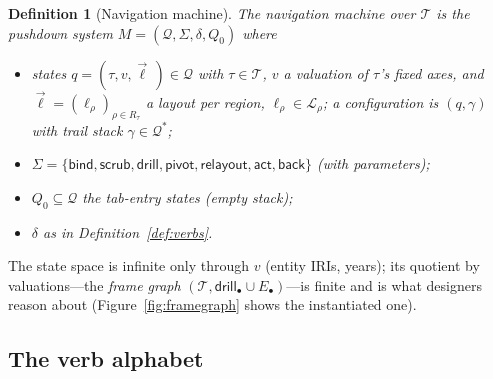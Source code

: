 \documentclass[11pt,a4paper]{article}
\newtheorem{definition}{Definition}[section]
\theoremstyle{remark}
\newcommand{\vbind}{\mathsf{bind}}
\newcommand{\vscrub}{\mathsf{scrub}}
\newcommand{\vdrill}{\mathsf{drill}}
\newcommand{\vpivot}{\mathsf{pivot}}
\newcommand{\vrelayout}{\mathsf{relayout}}
\newcommand{\vact}{\mathsf{act}}
\newcommand{\vback}{\mathsf{back}}
\newcommand{\TT}{\mathcal{T}}                    %
\newcommand{\QQ}{\mathcal{Q}}
\newcommand{\LL}{\mathcal{L}}
\newcommand{\Sig}{\Sigma}
\begin{document}
\begin{definition}[Navigation machine]\label{def:machine}
The \emph{navigation machine} over $\TT$ is the pushdown system
$M = (\QQ, \Sig, \delta, Q_0)$ where
\begin{itemize}
\item states $q = (\tau, v, \vec{\ell}\,) \in \QQ$ with $\tau \in \TT$, $v$ a
  valuation of $\tau$'s fixed axes, and $\vec{\ell} = (\ell_\rho)_{\rho \in R_\tau}$
  a layout per region, $\ell_\rho \in \LL_\rho$; a \emph{configuration} is
  $(q, \gamma)$ with trail stack $\gamma \in \QQ^{*}$;
\item $\Sig = \{\vbind, \vscrub, \vdrill, \vpivot, \vrelayout, \vact, \vback\}$
  (with parameters);
\item $Q_0 \subseteq \QQ$ the tab-entry states (empty stack);
\item $\delta$ as in Definition~\ref{def:verbs}.
\end{itemize}
\end{definition}

The state space is infinite only through $v$ (entity IRIs, years); its quotient by
valuations---the \emph{frame graph} $(\TT, \vdrill_\bullet \cup E_\bullet)$---is
finite and is what designers reason about
(Figure~\ref{fig:framegraph} shows the instantiated one).

\subsection{The verb alphabet}
\end{document}
